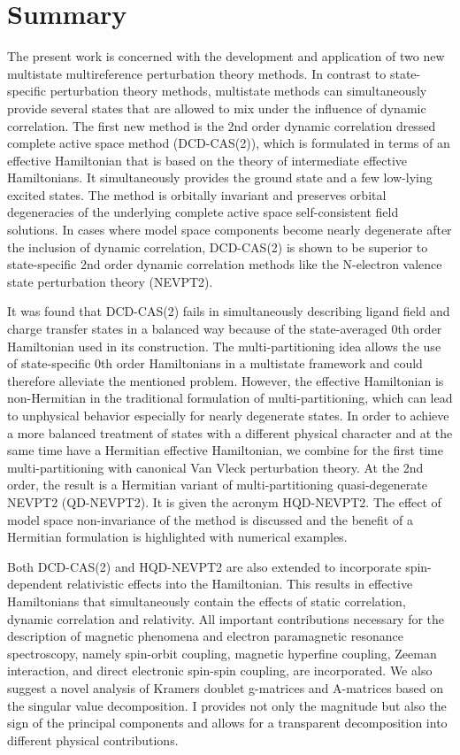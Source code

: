 \clearpage


\chapter*{Summary}
The present work is concerned with the development and application of two new multistate multireference perturbation theory methods. In contrast to state-specific perturbation theory methods, multistate methods can simultaneously provide several states that are allowed to mix under the influence of dynamic correlation.
The first new method is the 2nd order dynamic correlation dressed complete active space me\-thod (DCD-CAS(2)), which is formulated in terms of an effective Hamiltonian that is based on the theory of intermediate effective Hamiltonians. It simultaneously provides the ground state and a few low-lying excited states. The method is orbitally invariant and preserves orbital degeneracies of the underlying complete active space self-consistent field solutions. In cases where model space components become nearly degenerate after the inclusion of dynamic correlation, DCD-CAS(2) is shown to be superior to state-specific 2nd order dynamic correlation methods like the N-electron valence state perturbation theory (NEVPT2).

It was found that DCD-CAS(2) fails in simultaneously describing ligand field and charge transfer states in a balanced
way because of the state-averaged 0th order Hamiltonian used in its construction. The multi-partitioning idea allows the use of
state-specific 0th order Hamiltonians in a multistate framework and could therefore
alleviate the mentioned problem. However, the effective Hamiltonian is non-Hermitian
in the traditional formulation of multi-partitioning, which can lead to unphysical
behavior especially for nearly degenerate states. In order to achieve a more balanced
treatment of states with a different physical character and at the same time have a
Hermitian effective Hamiltonian, we combine for the first time multi-partitioning with
canonical Van Vleck perturbation theory. At the 2nd order, the result is a Hermitian
variant of multi-partitioning quasi-degenerate NEVPT2 (QD-NEVPT2). It is given the acronym HQD-NEVPT2. The effect of model space non-invariance of the method is discussed and the benefit of a Hermitian formulation is highlighted with numerical
examples.

Both DCD-CAS(2) and HQD-NEVPT2 are also extended to incorporate spin-dependent relativistic effects into the
Hamiltonian.
This results in effective Hamiltonians that simultaneously contain the effects of static
correlation, dynamic correlation and relativity. All important
contributions necessary for the description of magnetic phenomena and electron
paramagnetic resonance spectroscopy, namely spin-orbit coupling, magnetic
hyperfine coupling, Zeeman interaction, and direct electronic spin-spin coupling, are incorporated.
We also suggest a novel analysis of Kramers doublet g-matrices and A-matrices
based on the singular value decomposition. I provides not only the magnitude but
also the sign of the principal components and allows for a transparent decomposition into
different physical contributions.

